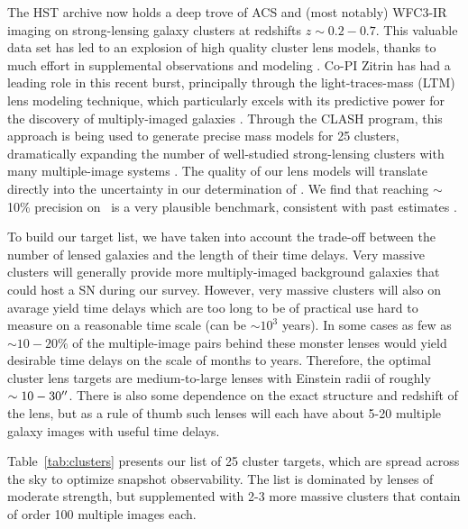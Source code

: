 The HST archive now holds a deep trove of ACS and (most notably)
WFC3-IR imaging on strong-lensing galaxy clusters at redshifts
$z\sim0.2-0.7$.  This valuable data set has led to an explosion of
high quality cluster lens models, thanks to much effort in
supplemental observations and modeling \citep[e.g.][]{Kneib:2004,
Smith:2005, Limousin:2008, Bradac:2008, Richard:2009}.  Co-PI Zitrin
has had a leading role in this recent burst, principally through the
light-traces-mass (LTM) lens modeling technique, which particularly
excels with its predictive power for the discovery of multiply-imaged
galaxies \citep{Broadhurst:2005, Zitrin:2009a}.  Through the CLASH
program, this approach is being used to generate precise
mass models for 25 clusters, dramatically expanding the number of
well-studied strong-lensing clusters with many multiple-image
systems \citep[e.g.][]{Zitrin:2009a, Zitrin:2009b, Zitrin:2011a,
Zitrin:2011b, Zitrin:2011c, Merten:2011, Zitrin:2012a, Zitrin:2012b,
Zitrin:2013a, Zitrin:2013b, Coe:2012, Coe:2013}.  
The quality of our lens models will translate directly into the
uncertainty in our determination of \Ho.  We find that reaching
$\sim$10\% precision on \Ho\ is a very plausible benchmark, consistent
with  past estimates \citep{Bolton:2003,Oguri:2003,Riehm:2011}.

To build our target list, we have taken into account the trade-off
between the number of lensed galaxies and the length of their time
delays.  Very massive clusters will generally provide more
multiply-imaged background galaxies that could host a SN during our
survey.  However, very massive clusters will also on avarage yield
time delays which are too long to be of practical use hard to measure
on a reasonable time scale (\dt can be $\sim10^3$ years). In some
cases as few as $\sim10-20\%$ of the multiple-image pairs behind these
monster lenses would yield desirable time delays on the scale of
months to years.  Therefore, the optimal cluster lens targets are
medium-to-large lenses with Einstein radii of roughly
$\sim10-30^{\prime\prime}$.  There is also some dependence on the exact
structure and redshift of the lens, but as a rule of thumb such lenses
will each have about 5-20 multiple galaxy images with useful time
delays.

Table~\ref{tab:clusters} presents our list of 25 cluster targets,
which are spread across the sky to optimize snapshot
observability. The list is dominated by lenses of moderate strength,
but supplemented with 2-3 more massive clusters that contain of order
100 multiple images each.
